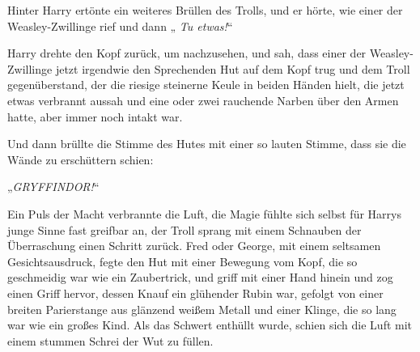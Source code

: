 Hinter Harry ertönte ein weiteres Brüllen des Trolls, und er hörte, wie einer der Weasley-Zwillinge  rief und dann
„\emph{ Tu etwas!}“

Harry drehte den Kopf zurück, um nachzusehen, und sah, dass einer der Weasley-Zwillinge jetzt irgendwie den Sprechenden Hut auf dem Kopf trug und dem Troll gegenüberstand, der die riesige steinerne Keule in beiden Händen hielt, die jetzt etwas verbrannt aussah und eine oder zwei rauchende Narben über den Armen hatte, aber immer noch intakt war.

Und dann brüllte die Stimme des Hutes mit einer so lauten Stimme, dass sie die Wände zu erschüttern schien:

„\emph{GRYFFINDOR!}“

Ein Puls der Macht verbrannte die Luft, die Magie fühlte sich selbst für Harrys junge Sinne fast greifbar an, der Troll sprang mit einem Schnauben der Überraschung einen Schritt zurück. Fred oder George, mit einem seltsamen Gesichtsausdruck, fegte den Hut mit einer Bewegung vom Kopf, die so geschmeidig war wie ein Zaubertrick, und griff mit einer Hand hinein und zog einen Griff hervor, dessen Knauf ein glühender Rubin war, gefolgt von einer breiten Parierstange aus glänzend weißem Metall und einer Klinge, die so lang war wie ein großes Kind. Als das Schwert enthüllt wurde, schien sich die Luft mit einem stummen Schrei der Wut zu füllen.

